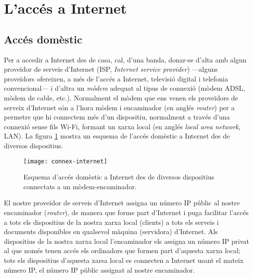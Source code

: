 


\section{L'accés a Internet}
\label{ss:adaI}

\subsection{Accés domèstic}
Per a accedir a Internet des de casa, cal, d'una banda, donar-se
d'alta amb algun proveïdor de serveis d'Internet (ISP, \emph{Internet
  service provider}) ---alguns proveïdors ofereixen, a més de l'accés
a Internet, televisió digital i telefonia convencional--- i d'altra un
\emph{mòdem} adequat al tipus de connexió (mòdem ADSL, mòdem de cable,
etc.). Normalment el mòdem que ens venen els proveïdors de serveix
d'Internet són a l'hora mòdem i encaminador (en anglés \emph{router})
per a permetre que hi connectem més d'un dispositiu, normalment a
través d'una connexió sense fils Wi-Fi, formant un xarxa local (en
anglés \emph{local area network}, LAN). La figura
\ref{fg:accesinternet} mostra un esquema de l'accés domèstic a
Internet des de diversos dispositius.

\begin{figure}
\centering
\texttt{[image: connex-internet]}
\caption{Esquema d'accés domèstic a Internet des de diversos
  dispositius connectats a un mòdem-encaminador.}
\label{fg:accesinternet}
\end{figure}

El nostre proveïdor de serveis d'Internet assigna un número IP públic
al nostre encaminador (\emph{router}), de manera que forme part
d'Internet i puga facilitar l'accés a tots els dispositius de la
nostra xarxa local (clients) a tots els serveis i documents
disponibles en qualsevol màquina (servidora) d'Internet. Als
dispositius de la nostra xarxa local l'encaminador els assigna un
número IP privat al que només tenen accés els ordinadors que formen
part d'aquesta xarxa local; tots els dispositius d'aquesta xarsa local
es connecten a Internet usant el mateix número IP, el número IP públic
assignat al nostre encaminador.

